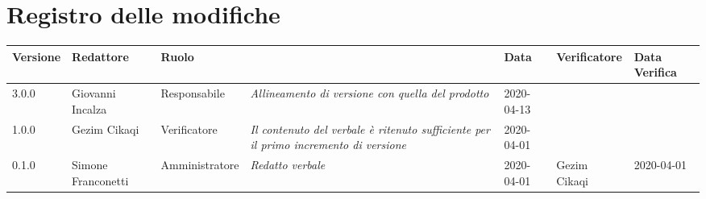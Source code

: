\section*{Registro delle modifiche}
\renewcommand{\arraystretch}{1.8}

  \setlength\LTleft{-1.7cm}
  \begin{longtable}{|p{1.7cm}|p{2cm}|p{2.5cm}|p{3cm}|p{1.7cm}|p{2cm}|p{2.3cm}|}
    \hline

    \rowcolor{header}
    \textbf{Versione} & \textbf{Redattore} & \textbf{Ruolo} & \centering{\textbf{Descrizione}} & \textbf{Data} & \textbf{Verificatore} & \textbf{Data Verifica}\\

    \hline
    3.0.0 & Giovanni Incalza & Responsabile & \small{\textit{Allineamento di versione con quella del prodotto}} & 2020-04-13 & &\\
    1.0.0 & Gezim Cikaqi & Verificatore & \small{\textit{Il contenuto del verbale è ritenuto sufficiente per il primo incremento di versione}} & 2020-04-01 & &\\
	0.1.0 & Simone Franconetti & Amministratore & \small{\textit{Redatto verbale}} & 2020-04-01 & Gezim Cikaqi & 2020-04-01 \\
    \hline
  \end{longtable}
  \setlength\LTleft{0cm}
